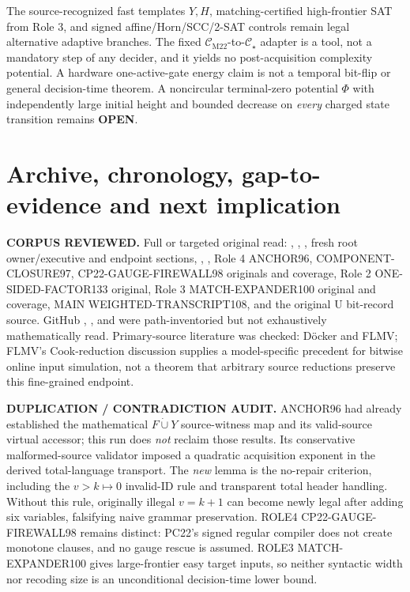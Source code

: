 \documentclass[11pt]{article}
\newcommand{\CM}{\mathcal C_{\mathrm{M22}}}
\newcommand{\CS}{\mathcal C_\star}
\begin{document}
The source-recognized fast templates \(Y,H\), matching-certified high-frontier SAT from Role 3, and signed affine/Horn/SCC/2-SAT controls remain legal alternative adaptive branches. The fixed \(\CM\)-to-\(\CS\) adapter is a tool, not a mandatory step of any decider, and it yields no post-acquisition complexity potential. A hardware one-active-gate energy claim is not a temporal bit-flip or general decision-time theorem. A noncircular terminal-zero potential \(\Phi\) with independently large initial height and bounded decrease on \emph{every} charged state transition remains \textbf{OPEN}.

\section{Archive, chronology, gap-to-evidence and next implication}
\noindent\textbf{CORPUS REVIEWED.} Full or targeted original read: , , , fresh root  owner/executive and endpoint sections, , , Role 4 ANCHOR96, COMPONENT-CLOSURE97, CP22-GAUGE-FIREWALL98 originals and coverage, Role 2 ONE-SIDED-FACTOR133 original, Role 3 MATCH-EXPANDER100 original and coverage, MAIN WEIGHTED-TRANSCRIPT108, and the original U bit-record source. GitHub , ,  and  were path-inventoried but not exhaustively mathematically read. Primary-source literature was checked: D\"ocker and FLMV; FLMV's Cook-reduction discussion supplies a model-specific precedent for bitwise online input simulation, not a theorem that arbitrary source reductions preserve this fine-grained endpoint.

\noindent\textbf{DUPLICATION / CONTRADICTION AUDIT.} ANCHOR96 had already established the mathematical \(F\dot\cup Y\) source-witness map and its valid-source virtual accessor; this run does \emph{not} reclaim those results. Its conservative malformed-source validator imposed a quadratic acquisition exponent in the derived total-language transport. The \emph{new} lemma is the no-repair criterion, including the \(v>k\mapsto0\) invalid-ID rule and transparent total header handling. Without this rule, originally illegal \(v=k+1\) can become newly legal after adding six variables, falsifying naive grammar preservation. ROLE4 CP22-GAUGE-FIREWALL98 remains distinct: PC22's signed regular compiler does not create monotone clauses, and no gauge rescue is assumed. ROLE3 MATCH-EXPANDER100 gives large-frontier easy target inputs, so neither syntactic width nor recoding size is an unconditional decision-time lower bound.
\end{document}

